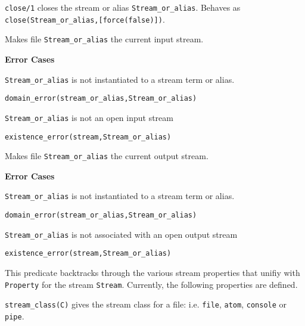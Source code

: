 \begin{description}
%
{\tt close/1} closes the stream or alias {\tt Stream\_or\_alias}.
Behaves as  {\tt close(Stream\_or\_alias,[force(false)])}.

    Makes file {\tt Stream\_or\_alias} the current input stream. 

{\bf Error Cases}
\bi
\item 	{\tt Stream\_or\_alias} is not instantiated to a stream term
or alias.
\bi
\item 	{\tt domain\_error(stream\_or\_alias,Stream\_or\_alias)}
\ei
\item 	{\tt Stream\_or\_alias} is not an open input stream
\bi
\item 	{\tt existence\_error(stream,Stream\_or\_alias)}
\ei
\ei

    Makes file {\tt Stream\_or\_alias} the current output stream. 

{\bf Error Cases}
\bi
\item 	{\tt Stream\_or\_alias} is not instantiated to a stream term
or alias.
\bi
\item 	{\tt domain\_error(stream\_or\_alias,Stream\_or\_alias)}
\ei
\item 	{\tt Stream\_or\_alias} is not associated with an open output stream
\bi
\item 	{\tt existence\_error(stream,Stream\_or\_alias)}
\ei
\ei

%
This predicate backtracks through the various stream properties that
unifiy with {\tt Property} for the stream {\tt Stream}.  Currently,
the following properties are defined.

\bi
\item {\tt stream\_class(C)} gives the stream class for a file:
i.e. {\tt file}, {\tt atom}, {\tt console} or {\tt pipe}.


\end{description}
